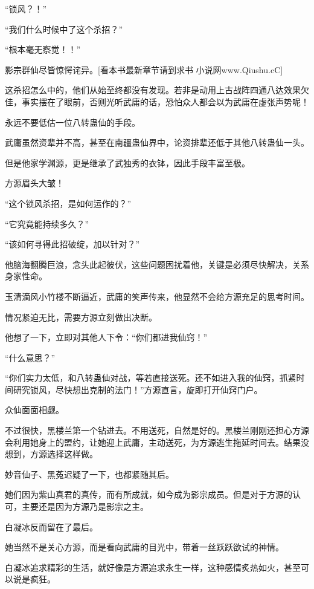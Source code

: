 
\begin{this_body}

“锁风？！”

“我们什么时候中了这个杀招？”

“根本毫无察觉！！”

影宗群仙尽皆惊愕诧异。[看本书最新章节请到求书 小说网www.Qiushu.cC]

这杀招怎么中的，他们从始至终都没有发现。若非是动用上古战阵四通八达效果欠佳，事实摆在了眼前，否则光听武庸的话，恐怕众人都会以为武庸在虚张声势呢！

永远不要低估一位八转蛊仙的手段。

武庸虽然资辈并不高，甚至在南疆蛊仙界中，论资排辈还低于其他八转蛊仙一头。

但是他家学渊源，更是继承了武独秀的衣钵，因此手段丰富至极。

方源眉头大皱！

“这个锁风杀招，是如何运作的？”

“它究竟能持续多久？”

“该如何寻得此招破绽，加以针对？”

他脑海翻腾巨浪，念头此起彼伏，这些问题困扰着他，关键是必须尽快解决，关系身家性命。

玉清滴风小竹楼不断逼近，武庸的笑声传来，他显然不会给方源充足的思考时间。

情况紧迫无比，需要方源立刻做出决断。

他想了一下，立即对其他人下令：“你们都进我仙窍！”

“什么意思？”

“你们实力太低，和八转蛊仙对战，等若直接送死。还不如进入我的仙窍，抓紧时间研究锁风，尽快想出克制的法门！”方源直言，旋即打开仙窍门户。

众仙面面相觑。

不过很快，黑楼兰第一个钻进去。不用送死，自然是好的。黑楼兰刚刚还担心方源会利用她身上的盟约，让她迎上武庸，主动送死，为方源逃生拖延时间去。结果没想到，方源选择这样做。

妙音仙子、黑菟迟疑了一下，也都紧随其后。

她们因为紫山真君的真传，而有所成就，如今成为影宗成员。但是对于方源的认可，主要还是因为方源乃是影宗之主。

白凝冰反而留在了最后。

她当然不是关心方源，而是看向武庸的目光中，带着一丝跃跃欲试的神情。

白凝冰追求精彩的生活，就好像是方源追求永生一样，这种感情炙热如火，甚至可以说是疯狂。


\end{this_body}
